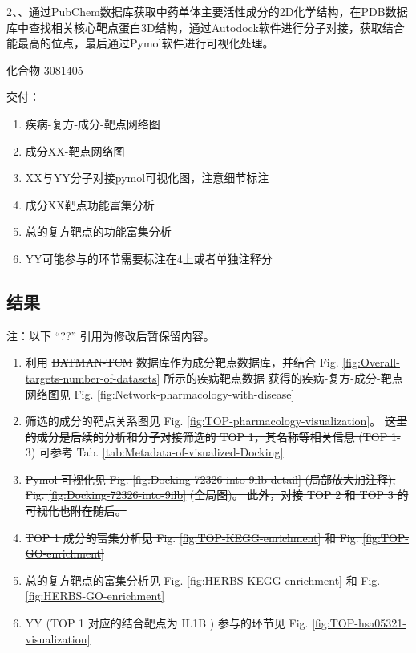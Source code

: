 \documentclass[
]{article}
\providecommand{\tightlist}{%
  \setlength{\itemsep}{0pt}\setlength{\parskip}{0pt}}
\begin{document}
2、、通过PubChem数据库获取中药单体主要活性成分的2D化学结构，在PDB数据库中查找相关核心靶点蛋白3D结构，通过Autodock软件进行分子对接，获取结合能最高的位点，最后通过Pymol软件进行可视化处理。

化合物 3081405

交付：

\begin{enumerate}
\def\labelenumi{\arabic{enumi}.}
\tightlist
\item
  疾病-复方-成分-靶点网络图
\item
  成分XX-靶点网络图
\item
  XX与YY分子对接pymol可视化图，注意细节标注
\item
  成分XX靶点功能富集分析
\item
  总的复方靶点的功能富集分析
\item
  YY可能参与的环节需要标注在4上或者单独注释分
\end{enumerate}

\hypertarget{ux7ed3ux679c}{%
\subsection{结果}\label{ux7ed3ux679c}}

注：以下 ``??'' 引用为修改后暂保留内容。

\begin{enumerate}
\def\labelenumi{\arabic{enumi}.}
\tightlist
\item
  利用 \sout{BATMAN-TCM} 数据库作为成分靶点数据库，并结合 Fig. \ref{fig:Overall-targets-number-of-datasets} 所示的疾病靶点数据
  获得的疾病-复方-成分-靶点网络图见 Fig. \ref{fig:Network-pharmacology-with-disease}
\item
  筛选的成分的靶点关系图见 Fig. \ref{fig:TOP-pharmacology-visualization}。
  \sout{这里的成分是后续的分析和分子对接筛选的 TOP 1，其名称等相关信息 (TOP 1-3) 可参考 Tab. \ref{tab:Metadata-of-visualized-Docking}}
\item
  \sout{Pymol 可视化见 Fig. \ref{fig:Docking-72326-into-9ilb-detail} (局部放大加注释),
  Fig. \ref{fig:Docking-72326-into-9ilb} (全局图)。
  此外，对接 TOP 2 和 TOP 3 的可视化也附在随后。}
\item
  \sout{TOP 1 成分的富集分析见 Fig. \ref{fig:TOP-KEGG-enrichment} 和 Fig. \ref{fig:TOP-GO-enrichment}}
\item
  总的复方靶点的富集分析见 Fig. \ref{fig:HERBS-KEGG-enrichment} 和 Fig. \ref{fig:HERBS-GO-enrichment}
\item
  \sout{YY (TOP 1 对应的结合靶点为 IL1B ) 参与的环节见 Fig. \ref{fig:TOP-hsa05321-visualization}}
\end{enumerate}
\end{document}
